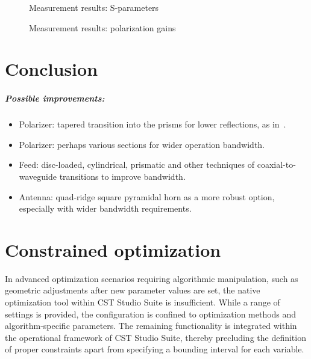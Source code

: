 \documentclass[11pt,a4paper,twoside,openany]{report}
\begin{document}
\begin{figure}[!ht]
    \centering
    
    \caption{\label{fig:meas-vs-sim-sparameters}Measurement results: S-parameters}
\end{figure}

\begin{figure}[!ht]
    \centering
    
    \caption{\label{fig:meas-vs-sim-boresight-radiation}Measurement results: polarization gains}
\end{figure}

\chapter*{Conclusion}
\label{chapter:conclusion}

\lipsum[10-13]

\paragraph{Possible improvements:}
\begin{itemize}
    \item Polarizer: tapered transition into the prisms for lower reflections, as in~\parencite{bhardwaj-volakis:hexagonal-waveguide-based-circularly-polarized-horn-antennas-for-submmwave-terahertz-band}.
    \item Polarizer: perhaps various sections for wider operation bandwidth.
    \item Feed: disc-loaded, cylindrical, prismatic and other techniques of coaxial-to-waveguide transitions to improve bandwidth.
    \item Antenna: quad-ridge square pyramidal horn as a more robust option, especially with wider bandwidth requirements.
\end{itemize}

\appendix
\chapter{Constrained optimization}
\label{appendix:constrained-optimization}
In advanced optimization scenarios requiring algorithmic manipulation, such as geometric adjustments after new parameter values are set, the native optimization tool within CST Studio Suite is insufficient. While a range of settings is provided, the configuration is confined to optimization methods and algorithm-specific parameters. The remaining functionality is integrated within the operational framework of CST Studio Suite, thereby precluding the definition of proper constraints apart from specifying a bounding interval for each variable.
\end{document}
